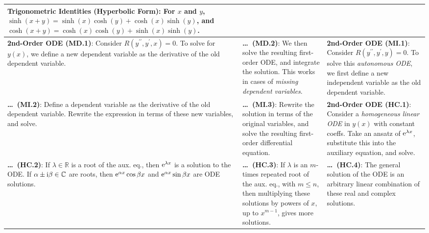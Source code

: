 \begin{tabular}{|m{.31\linewidth}|m{.31\linewidth}|m{.31\linewidth}|}
\textbf{Trigonometric Identities (Hyperbolic Form)}:
    For $ x $ and $ y $,
        $ \sinh(x + y) = \sinh(x) \cosh(y) + \cosh(x) \sinh(y)$, and
        $ \cosh(x + y) = \cosh(x) \cosh(y) + \sinh(x) \sinh(y)$. \\

\hline

\textbf{2nd-Order ODE (MD.1)}:
    Consider $ R(y^{\prime\prime}, y^\prime, x) = 0 $. To solve for $ y(x) $, we
    define a new dependent variable as the derivative of the old dependent
    variable. &

\textbf{\ldots\ (MD.2)}:
    We then solve the resulting first-order ODE, and integrate the solution.
    This works in cases of \emph{missing dependent variables}. &

\textbf{2nd-Order ODE (MI.1)}:
    Consider $ R(y^{\prime\prime}, y^\prime, y) = 0$. To solve this
    \emph{autonomous ODE}, we first define a new independent variable as the old
    dependent variable. \\

\hline

\textbf{\ldots\ (MI.2)}:
    Define a dependent variable as the derivative of the old dependent variable.
    Rewrite the expression in terms of these new variables, and solve. &

\textbf{\ldots\ (MI.3)}:
    Rewrite the solution in terms of the original variables, and solve the
    resulting first-order differential equation. &

\textbf{2nd-Order ODE (HC.1)}:
    Consider a \emph{homogeneous linear ODE} in $ y(x) $ with constant coeffs.
    Take an ansatz of $ \mathrm{e}^{\lambda x} $, substitute this into the
    auxiliary equation, and solve. \\

\hline

\textbf{\ldots\ (HC.2)}:
    If
        $ \lambda \in \mathbb{R} $ is a root of the aux. eq.,
    then
        $ \mathrm{e}^{\lambda x} $ is a solution to the ODE.
    If
        $ \alpha \pm \mathrm{i} \beta \in \mathbb{C} $ are roots,
    then
        $ \mathrm{e}^{\alpha x} \cos \beta x $ and
        $ \mathrm{e}^{\alpha x} \sin \beta x $
        are ODE solutions. &

\textbf{\ldots\ (HC.3)}:
    If $ \lambda $ is an $m$-times repeated root of the aux. eq., with
    $ m \leq n $, then multiplying these solutions by powers of $ x $, up to
    $ x^{m - 1} $, gives more solutions. &

\textbf{\ldots\ (HC.4)}:
    The general solution of the ODE is an arbitrary linear combination of these
    real and complex solutions. \\


\end{tabular}
